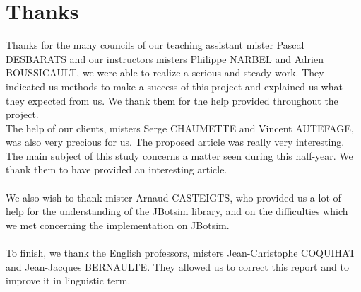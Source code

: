\chapter*{Thanks}

Thanks for the many councils of our teaching assistant mister Pascal DESBARATS and our instructors misters Philippe NARBEL and Adrien BOUSSICAULT, we were able to realize a serious and steady work. They indicated us methods to make a success of this project and explained us what they expected from us. We thank them for the help provided throughout the project.\\

The help of our clients, misters Serge CHAUMETTE and Vincent AUTEFAGE, was also very precious for us. The proposed article was really very interesting. The main subject of this study concerns a matter seen during this half-year. We thank them to have provided an interesting article.\\\\

We also wish to thank mister Arnaud CASTEIGTS, who provided us a lot of help for the understanding of the JBotsim library, and on the difficulties which we met concerning the implementation on JBotsim.\\\\

To finish, we thank the English professors, misters Jean-Christophe COQUIHAT and Jean-Jacques BERNAULTE. They allowed us to correct this report and to improve it in linguistic term.